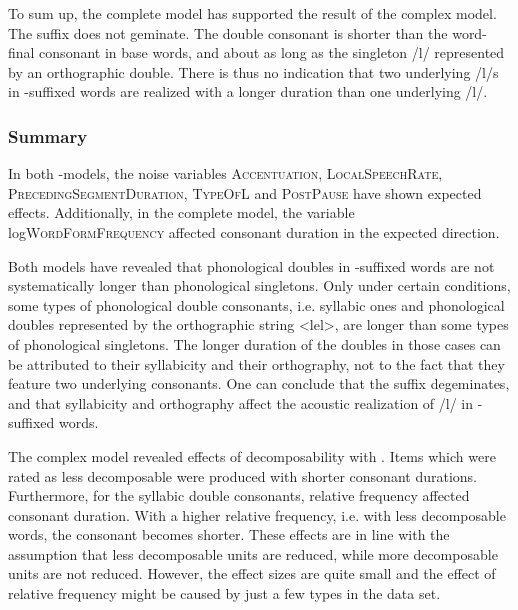 To sum up, the complete model has supported the result of the complex model. The suffix  does not geminate. The double consonant is shorter than the word-final consonant in base words, and about as long as the singleton /l/ represented by an orthographic double. There is thus no indication that two underlying /l/s in -suffixed words are realized with a longer duration than one underlying /l/.




\subsubsection{Summary} \label{ly experiment summary}

In both -models, the noise variables \textsc{Accentuation}, \textsc{LocalSpeechRate}, \textsc{PrecedingSegmentDuration}, \textsc{TypeOfL} and \textsc{PostPause} have shown expected effects. Additionally, in the complete model, the variable log\textsc{WordFormFrequency} affected consonant duration in the expected direction.

Both models have revealed that phonological doubles in -suffixed words are not systematically longer than phonological singletons. Only under certain conditions, some types of phonological double consonants, i.e. syllabic ones and phonological doubles represented by the orthographic string <lel>, are longer than some types of phonological singletons. The longer duration of the doubles in those cases can be attributed to their syllabicity and their orthography, not to the fact that they feature two underlying consonants. %
One can conclude that the suffix  degeminates, and that syllabicity and orthography affect the acoustic realization of /l/ in -suffixed words. %

The complex model revealed effects of decomposability with . Items which were rated as less decomposable were produced with shorter consonant durations. Furthermore, for the syllabic double consonants, relative frequency affected consonant duration. With a higher relative frequency, i.e. with less decomposable words, the consonant becomes shorter. 
These effects are in line with the assumption that less decomposable units are reduced, while more decomposable units are not reduced. However, the effect sizes are quite small and the effect of relative frequency might be caused by just a few types in the data set. 

